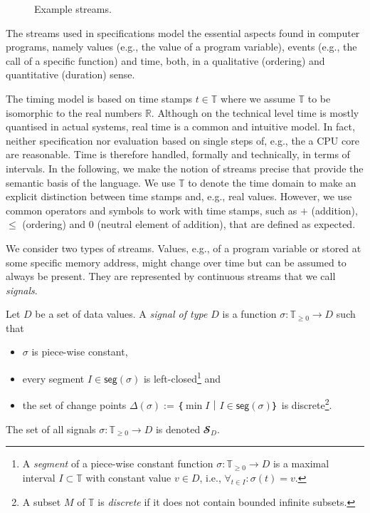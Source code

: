 \begin{figure}
  
  \caption{Example streams.\label{fig:streams}} 
\end{figure}

The streams used in \tessla specifications model the essential aspects found in computer programs, namely values (e.g., the value of a program variable), events (e.g., the call of a specific function) and time, both, in a qualitative (ordering) and quantitative (duration) sense.

The timing model is based on time stamps $t∈𝕋$ where we assume $𝕋$ to be isomorphic to the real numbers $ℝ$.
Although on the technical level time is mostly quantised in actual systems, real time is a common and intuitive model.
In fact, neither specification nor evaluation based on single steps of, e.g., the a CPU core are reasonable. 
Time is therefore handled, formally and technically, in terms of intervals.
In the following, we make the notion of streams precise that provide the semantic basis of the language.
We use $𝕋$ to denote the time domain to make an explicit distinction between time stamps and, e.g., real values.
However, we use common operators and symbols to work with time stamps, such as $+$ (addition), $≤$ (ordering) and $0$ (neutral element of addition), that are defined as expected.

We consider two types of streams.
Values, e.g., of a program variable or stored at some specific memory address, might change over time but can be assumed to always be present.
They are represented by continuous streams that we call \emph{signals}. 

\begin{definition}[Signals]
  Let $D$ be a set of data values. 
  A \emph{signal of type $D$} is a function $σ: 𝕋_{≥0} → D$ such that
  \begin{itemize}
    \item $σ$ is piece-wise constant,
    \item every segment $I∈\mathsf{seg}(σ)$ is left-closed\footnote{
          A \emph{segment} of a piece-wise constant function $σ: 𝕋_{≥0} → D$ is a maximal interval $I⊂𝕋$ with constant value $v∈D$, i.e., $∀_{t∈I}:σ(t)=v$.} and
    \item the set of change points $Δ(σ) := ｛\min I｜I∈\mathsf{seg}(σ)｝$ is discrete\footnote{A subset $M$ of $𝕋$ is \emph{discrete} if it does not contain bounded infinite subsets.}.
  \end{itemize}
  The set of all signals $σ: 𝕋_{≥0} → D$ is denoted $𝓢_D$.
\end{definition}

